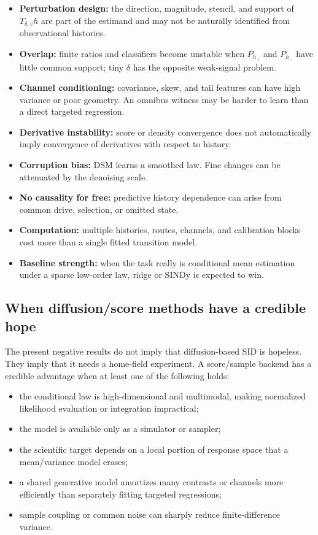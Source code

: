 \documentclass[10pt]{article}
\begin{document}
\begin{itemize}
  \item \textbf{Perturbation design:} the direction, magnitude, stencil, and support of \(T_{\delta,v}h\) are part of the estimand and may not be naturally identified from observational histories.
  \item \textbf{Overlap:} finite ratios and classifiers become unstable when \(P_{h_+}\) and \(P_{h_-}\) have little common support; tiny \(\delta\) has the opposite weak-signal problem.
  \item \textbf{Channel conditioning:} covariance, skew, and tail features can have high variance or poor geometry. An omnibus witness may be harder to learn than a direct targeted regression.
  \item \textbf{Derivative instability:} score or density convergence does not automatically imply convergence of derivatives with respect to history.
  \item \textbf{Corruption bias:} DSM learns a smoothed law. Fine changes can be attenuated by the denoising scale.
  \item \textbf{No causality for free:} predictive history dependence can arise from common drive, selection, or omitted state.
  \item \textbf{Computation:} multiple histories, routes, channels, and calibration blocks cost more than a single fitted transition model.
  \item \textbf{Baseline strength:} when the task really is conditional mean estimation under a sparse low-order law, ridge or SINDy is expected to win.
\end{itemize}

\subsection{When diffusion/score methods have a credible hope}

The present negative results do not imply that diffusion-based SID is hopeless. They imply that it needs a home-field experiment. A score/sample backend has a credible advantage when at least one of the following holds:

\begin{itemize}
  \item the conditional law is high-dimensional and multimodal, making normalized likelihood evaluation or integration impractical;
  \item the model is available only as a simulator or sampler;
  \item the scientific target depends on a local portion of response space that a mean/variance model erases;
  \item a shared generative model amortizes many contrasts or channels more efficiently than separately fitting targeted regressions;
  \item sample coupling or common noise can sharply reduce finite-difference variance.
\end{itemize}
\end{document}
